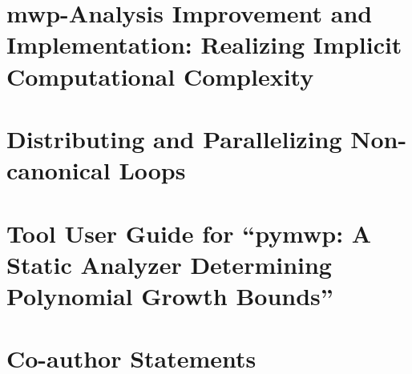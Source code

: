 \appendix

\chapter{mwp-Analysis Improvement and Implementation: Realizing Implicit Computational Complexity}\label{app:sec:fscd}


\chapter{Distributing and Parallelizing Non-canonical Loops}
\label{app:sec:vmcai}


\chapter{Tool User Guide for \enquote{pymwp: A Static Analyzer Determining Polynomial Growth Bounds}}\label{app:sec:tool-guide}


\chapter{Co-author Statements}\label{app:sec:coauth}


\clearpage\pagestyle{plain}
\printnoidxglossary[type=\acronymtype]
\clearpage\printindex
